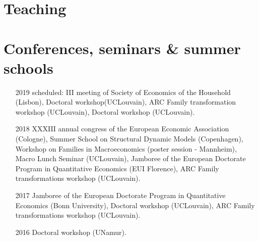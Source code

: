 \documentclass[10pt]{article} %
\begin{document}



\section{Teaching}




\section{Conferences, seminars \& summer schools}
\begin{itemize}
\item[2019] scheduled: III meeting of Society of Economics of the Household (Lisbon), Doctoral workshop(UCLouvain), ARC Family transformation workshop (UCLouvain), Doctoral workshop (UCLouvain).
\item[2018] XXXIII annual congress of the European Economic Association (Cologne), Summer School on Structural Dynamic Models (Copenhagen), Workshop on Families in Macroeconomics (poster session - Mannheim), Macro Lunch Seminar (UCLouvain), Jamboree of the European Doctorate Program in Quantitative Economics (EUI Florence), ARC Family transformations workshop (UCLouvain).
\item[2017] Jamboree of the European Doctorate Program in Quantitative Economics (Bonn University), Doctoral workshop (UCLouvain), ARC Family transformations workshop (UCLouvain).
\item[2016] Doctoral workshop (UNamur).
\end{itemize}



\end{document}

